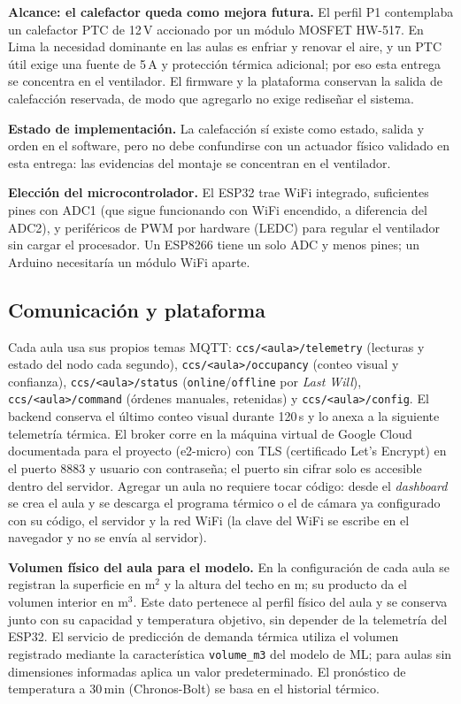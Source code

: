 \documentclass[10pt,a4paper]{article}
\newcommand{\cod}[1]{\texttt{\small #1}}
\begin{document}
\textbf{Alcance: el calefactor queda como mejora futura.} El perfil P1 contemplaba un calefactor PTC de 12\,V accionado por un módulo MOSFET HW-517. En Lima la necesidad dominante en las aulas es enfriar y renovar el aire, y un PTC útil exige una fuente de 5\,A y protección térmica adicional; por eso esta entrega se concentra en el ventilador. El firmware y la plataforma conservan la salida de calefacción reservada, de modo que agregarlo no exige rediseñar el sistema.

\textbf{Estado de implementación.} La calefacción sí existe como estado, salida y orden en el software, pero no debe confundirse con un actuador físico validado en esta entrega: las evidencias del montaje se concentran en el ventilador.

\textbf{Elección del microcontrolador.} El ESP32 trae WiFi integrado, suficientes pines con ADC1 (que sigue funcionando con WiFi encendido, a diferencia del ADC2), y periféricos de PWM por hardware (LEDC) para regular el ventilador sin cargar el procesador. Un ESP8266 tiene un solo ADC y menos pines; un Arduino necesitaría un módulo WiFi aparte.

\subsection{Comunicación y plataforma}
Cada aula usa sus propios temas MQTT: \cod{ccs/<aula>/telemetry} (lecturas y estado del nodo cada segundo), \cod{ccs/<aula>/occupancy} (conteo visual y confianza), \cod{ccs/<aula>/status} (\cod{online}/\cod{offline} por \emph{Last Will}), \cod{ccs/<aula>/command} (órdenes manuales, retenidas) y \cod{ccs/<aula>/config}. El backend conserva el último conteo visual durante 120\,s y lo anexa a la siguiente telemetría térmica. El broker corre en la máquina virtual de Google Cloud documentada para el proyecto (e2-micro) con TLS (certificado Let's Encrypt) en el puerto 8883 y usuario con contraseña; el puerto sin cifrar solo es accesible dentro del servidor. Agregar un aula no requiere tocar código: desde el \emph{dashboard} se crea el aula y se descarga el programa térmico o el de cámara ya configurado con su código, el servidor y la red WiFi (la clave del WiFi se escribe en el navegador y no se envía al servidor).

\textbf{Volumen físico del aula para el modelo.} En la configuración de cada aula se registran la superficie en m$^2$ y la altura del techo en m; su producto da el volumen interior en m$^3$. Este dato pertenece al perfil físico del aula y se conserva junto con su capacidad y temperatura objetivo, sin depender de la telemetría del ESP32. El servicio de predicción de demanda térmica utiliza el volumen registrado mediante la característica \cod{volume\_m3} del modelo de ML; para aulas sin dimensiones informadas aplica un valor predeterminado. El pronóstico de temperatura a 30\,min (Chronos-Bolt) se basa en el historial térmico.
\end{document}
